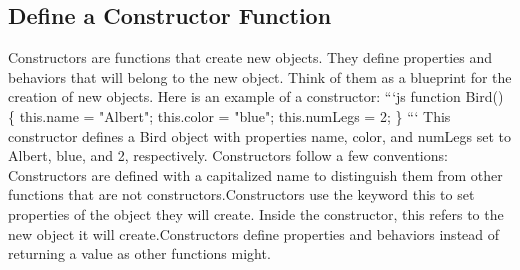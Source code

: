 \documentclass{article}%
\begin{document}
\subsection{Define a Constructor Function}%
\label{subsec:DefineaConstructorFunction}%
Constructors are functions that create new objects. They define properties and behaviors that will belong to the new object. Think of them as a blueprint for the creation of new objects.\newline%
Here is an example of a constructor:\newline%
```js\newline%
function Bird() \{\newline%
  this.name = "Albert";\newline%
  this.color = "blue";\newline%
  this.numLegs = 2;\newline%
\}\newline%
```\newline%
This constructor defines a Bird object with properties name, color, and numLegs set to Albert, blue, and 2, respectively.\newline%
Constructors follow a few conventions:\newline%
Constructors are defined with a capitalized name to distinguish them from other functions that are not constructors.Constructors use the keyword this to set properties of the object they will create. Inside the constructor, this refers to the new object it will create.Constructors define properties and behaviors instead of returning a value as other functions might.\newline%

%
\end{document}
